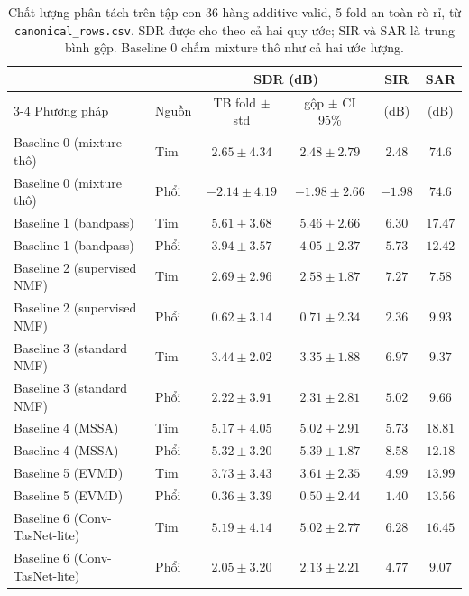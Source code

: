 \documentclass[11pt]{article}
\begin{document}
\begin{table}[H]
\centering
\caption{Chất lượng phân tách trên tập con 36 hàng additive-valid, 5-fold an toàn rò rỉ, từ \texttt{canonical\_rows.csv}. SDR được cho theo cả hai quy ước; SIR và SAR là trung bình gộp. Baseline 0 chấm mixture thô như cả hai ước lượng.}
\label{tab:baselinevalid}
\label{tab:pooledvalid}
\label{tab:sixmethodnative}
\small
\begin{tabular}{@{}llcccc@{}}
\toprule
 & & \multicolumn{2}{c}{SDR (dB)} & SIR & SAR \\
\cmidrule(lr){3-4}
Phương pháp & Nguồn & TB fold $\pm$ std & gộp $\pm$ CI 95\% & (dB) & (dB) \\
\midrule
Baseline 0 (mixture thô) & Tim & $2.65 \pm 4.34$ & $2.48 \pm 2.79$ & $2.48$ & $74.6$ \\
Baseline 0 (mixture thô) & Phổi & $-2.14 \pm 4.19$ & $-1.98 \pm 2.66$ & $-1.98$ & $74.6$ \\
\addlinespace
Baseline 1 (bandpass) & Tim & $5.61 \pm 3.68$ & $5.46 \pm 2.66$ & $6.30$ & $17.47$ \\
Baseline 1 (bandpass) & Phổi & $3.94 \pm 3.57$ & $4.05 \pm 2.37$ & $5.73$ & $12.42$ \\
\addlinespace
Baseline 2 (supervised NMF) & Tim & $2.69 \pm 2.96$ & $2.58 \pm 1.87$ & $7.27$ & $7.58$ \\
Baseline 2 (supervised NMF) & Phổi & $0.62 \pm 3.14$ & $0.71 \pm 2.34$ & $2.36$ & $9.93$ \\
\addlinespace
Baseline 3 (standard NMF) & Tim & $3.44 \pm 2.02$ & $3.35 \pm 1.88$ & $6.97$ & $9.37$ \\
Baseline 3 (standard NMF) & Phổi & $2.22 \pm 3.91$ & $2.31 \pm 2.81$ & $5.02$ & $9.66$ \\
\addlinespace
Baseline 4 (MSSA) & Tim & $5.17 \pm 4.05$ & $5.02 \pm 2.91$ & $5.73$ & $18.81$ \\
Baseline 4 (MSSA) & Phổi & $5.32 \pm 3.20$ & $5.39 \pm 1.87$ & $8.58$ & $12.18$ \\
\addlinespace
Baseline 5 (EVMD) & Tim & $3.73 \pm 3.43$ & $3.61 \pm 2.35$ & $4.99$ & $13.99$ \\
Baseline 5 (EVMD) & Phổi & $0.36 \pm 3.39$ & $0.50 \pm 2.44$ & $1.40$ & $13.56$ \\
\addlinespace
Baseline 6 (Conv-TasNet-lite) & Tim & $5.19 \pm 4.14$ & $5.02 \pm 2.77$ & $6.28$ & $16.45$ \\
Baseline 6 (Conv-TasNet-lite) & Phổi & $2.05 \pm 3.20$ & $2.13 \pm 2.21$ & $4.77$ & $9.07$ \\
\bottomrule
\end{tabular}
\end{table}
\end{document}
